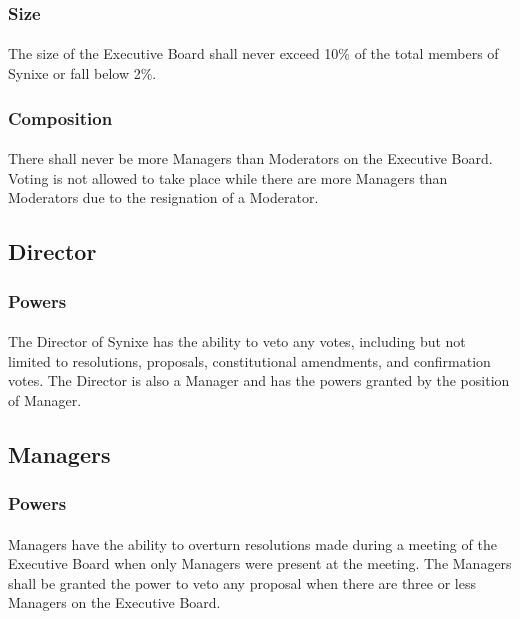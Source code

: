 \documentclass[10pt,a4paper]{article}
\begin{document}
\subsubsection{Size}
\paragraph{}
The size of the Executive Board shall never exceed 10\% of the total members of Synixe or fall below 2\%.
\subsubsection{Composition}
\paragraph{}
There shall never be more Managers than Moderators on the Executive Board. Voting is not allowed to take place while there are more Managers than Moderators due to the resignation of a Moderator.
\subsection{Director}
\subsubsection{Powers}
\paragraph{}
The Director of Synixe has the ability to veto any votes, including but not limited to resolutions, proposals, constitutional amendments, and confirmation votes. The Director is also a Manager and has the powers granted by the position of Manager.
\subsection{Managers}
\subsubsection{Powers}
\paragraph{}
Managers have the ability to overturn resolutions made during a meeting of the Executive Board when only Managers were present at the meeting. The Managers shall be granted the power to veto any proposal when there are three or less Managers on the Executive Board.
\end{document}
